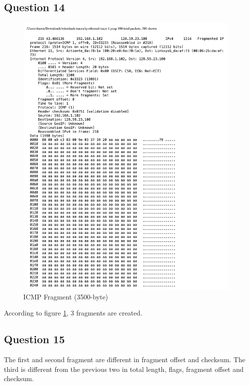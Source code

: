 \documentclass[titlepage, paper=a4, fontsize=11pt]{scrartcl} %
\numberwithin{equation}{section} %
\numberwithin{figure}{section} %
\numberwithin{table}{section} %
\begin{document}
\subsection*{Question 14}
\begin{figure}[!ht]
    \centering
    \includegraphics[width=\textwidth]{images/lab2-q14.pdf}
    \caption{ICMP Fragment (3500-byte)}
    \label{fig:ip-fragment3}
\end{figure}
According to figure \ref{fig:ip-fragment3}, 3 fragments are created. \\

\subsection*{Question 15}
The first and second fragment are different in fragment offset and checksum. The third is different from the previous two in total length, flags, fragment offset and checksum. 
\end{document}
